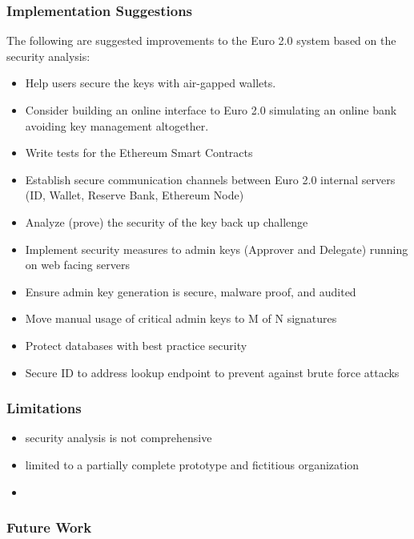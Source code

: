 \documentclass[12pt]{article} %
\begin{document}
{\subsubsection{Implementation Suggestions} \label{ssec:5.5:suggestions}
The following are suggested improvements to the Euro 2.0 system based on the security analysis:

\begin{itemize}
	\item Help users secure the keys with air-gapped wallets.
	\item Consider building an online interface to Euro 2.0 simulating an online bank avoiding key management altogether.
	\item Write tests for the Ethereum Smart Contracts
	\item Establish secure communication channels between Euro 2.0 internal servers (ID, Wallet, Reserve Bank, Ethereum Node)
	\item Analyze (prove) the security of the key back up challenge
	\item Implement security measures to admin keys (Approver and Delegate) running on web facing servers
	\item Ensure admin key generation is secure, malware proof, and audited
	\item Move manual usage of critical admin keys to M of N signatures
	\item Protect databases with best practice security
	\item Secure ID to address lookup endpoint to prevent against brute force attacks
\end{itemize}

\subsubsection{Limitations} \label{ssec:5.5:limitations}


\begin{itemize}
	\item security analysis is not comprehensive
	\item limited to a partially complete prototype and fictitious organization
	\item
\end{itemize}

\subsubsection{Future Work} \label{ssec:5.5:futureWork}

}
\end{document}
